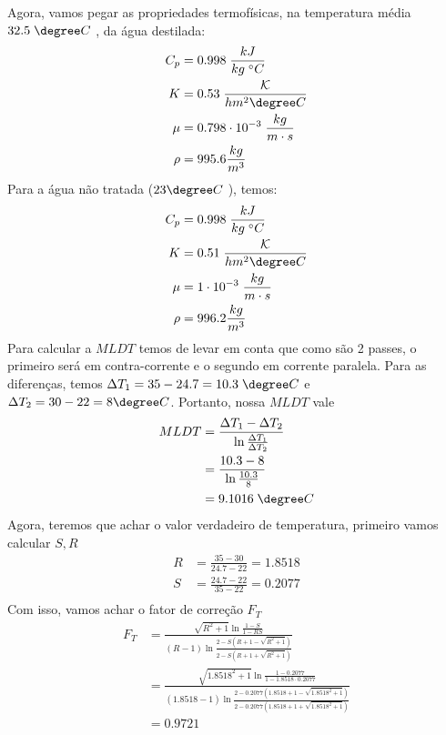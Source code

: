 Agora, vamos pegar as propriedades termofísicas, na temperatura média \(32.5 \; \degree C\) , da água destilada:
\begin{align}
    C_{p} &= 0.998 \; \frac{kJ}{kg \; ^{\circ}C} \\
    K &= 0.53 \; \frac{\mathcal{K} }{h m^{2} \degree C}\\
    \mu &= 0.798 \cdot 10^{-3} \; \frac{kg}{m \cdot s}\\
    \rho &= 995.6 \frac{kg}{m^{3}}
\end{align}
Para a água não tratada (\(23 \degree C\) ), temos:
\begin{align}
    C_{p} &= 0.998 \; \frac{kJ}{kg \; ^{\circ}C} \\
    K &= 0.51 \; \frac{\mathcal{K} }{h m^{2} \degree C}\\
    \mu &= 1 \cdot 10^{-3} \; \frac{kg}{m \cdot s}\\
    \rho &= 996.2 \frac{kg}{m^{3}}
\end{align}
Para calcular a \(MLDT\) temos de levar em conta que como são 2 passes, o primeiro será em
contra-corrente e o segundo em corrente paralela. Para as diferenças, temos \(\Delta T_1 = 35 - 24.7
= 10.3 \; \degree C\) e \(\Delta T_2 = 30 - 22 = 8 \degree C\). Portanto, nossa \(MLDT\) vale
\begin{align}
    MLDT &= \frac{\Delta T_1 - \Delta T_2}{\ln \frac{\Delta T_1}{\Delta T_2}}\\
    &= \frac{10.3 - 8}{\ln \frac{10.3}{8}}\\
    &= 9.1016 \; \degree C   
\end{align}
Agora, teremos que achar o valor verdadeiro de temperatura, primeiro vamos calcular \(S, R\)
\begin{align}
    R &= \frac{35 - 30}{24.7 - 22} = 1.8518 \\
    S &= \frac{24.7 - 22}{35 - 22} = 0.2077 \\
\end{align}
Com isso, vamos achar o fator de correção \(F_{T}\)
\begin{align}
    F_{T} &= \frac{\sqrt{R^{2} + 1} \ln \frac{1 - S}{1 - RS}}{\left( R -1 \right) \ln \frac{2 - S\left( R + 1 - \sqrt{R^{2} + 1}  \right) }{2 - S\left( R + 1 + \sqrt{R^{2} + 1}  \right) }}\\
    &= \frac{\sqrt{1.8518^{2} + 1} \ln \frac{1 - 0.2077}{1 - 1.8518 \cdot 0.2077}}{\left( 1.8518 -1 \right) \ln \frac{2 - 0.2077\left( 1.8518 + 1 - \sqrt{1.8518^{2} + 1}  \right) }{2 - 0.2077\left( 1.8518 + 1 + \sqrt{1.8518^{2} + 1}  \right) }}\\
    &= 0.9721
\end{align}
